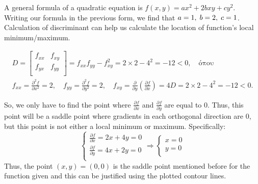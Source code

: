 A general formula of a quadratic equation is $f(x,y) = ax^2 + 2bxy + cy^2$. Writing our formula in the previous form, we find that $a=1, \hspace{1mm} b=2, \hspace{1mm} c=1$.
Calculation of discriminant can help us calculate the location of function's local minimum/maximum.

\begin{equation}
\begin{gathered}
D =
\left[
\begin{array}{cc}
	f_{xx} & f_{xy} \\
	f_{yx} & f_{yy} \\
\end{array}
\right]
= f_{xx} f_{yy} - f^2_{xy} = 2 \times 2 - 4^2 = -12 < 0, \quad \text{όπου} \\
f_{xx} = \frac{\partial^2 f}{\partial x^2} = 2, \quad
f_{yy} = \frac{\partial^2 f}{\partial y^2} = 2, \quad
f_{xy} = \frac{\partial}{\partial y} \left( \frac{\partial f}{\partial x} \right) = 4
D = 2 \times 2 - 4^2 = -12 < 0.
\end{gathered}
\end{equation}

So, we only have to find the point where $\frac{\partial f}{\partial x}$ and $\frac{\partial f}{\partial y}$ are equal to $0$. Thus, this point will be a saddle point where gradients in each orthogonal direction are $0$, but this point is not either a local minimum or maximum.
Specifically:
\begin{equation}
\left\{
\begin{array}{c}
	\frac{\partial f}{\partial x} = 2x + 4y = 0 \\ 
	\frac{\partial f}{\partial y} = 4x + 2y = 0 \\
\end{array}
\right.
\Rightarrow
\left\{
\begin{array}{c}
	x = 0\\y=0\\
\end{array}
\right.
\end{equation}
Thus, the point $(x,y) = (0,0)$ is the saddle point mentioned before for the function given and this can be justified using the plotted contour lines.